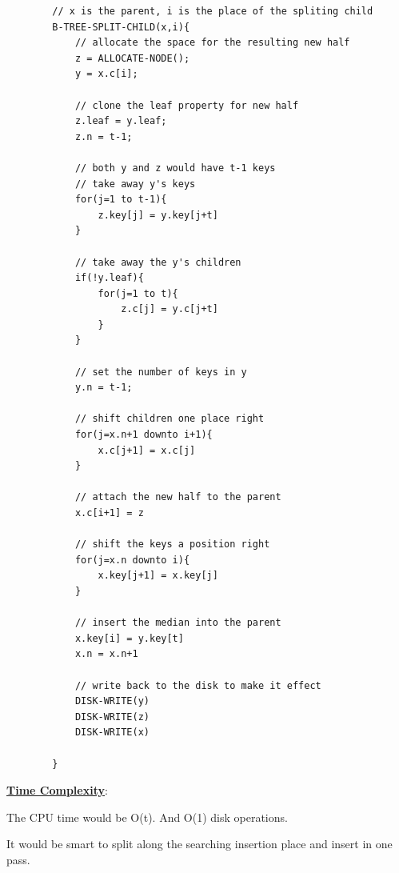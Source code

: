     \begin{lstlisting}
        // x is the parent, i is the place of the spliting child
        B-TREE-SPLIT-CHILD(x,i){
            // allocate the space for the resulting new half
            z = ALLOCATE-NODE();
            y = x.c[i];
            
            // clone the leaf property for new half
            z.leaf = y.leaf;
            z.n = t-1;

            // both y and z would have t-1 keys
            // take away y's keys
            for(j=1 to t-1){
                z.key[j] = y.key[j+t]
            }

            // take away the y's children
            if(!y.leaf){
                for(j=1 to t){
                    z.c[j] = y.c[j+t]
                }
            }

            // set the number of keys in y
            y.n = t-1;

            // shift children one place right
            for(j=x.n+1 downto i+1){
                x.c[j+1] = x.c[j]
            }

            // attach the new half to the parent
            x.c[i+1] = z

            // shift the keys a position right 
            for(j=x.n downto i){
                x.key[j+1] = x.key[j]
            }

            // insert the median into the parent
            x.key[i] = y.key[t]
            x.n = x.n+1

            // write back to the disk to make it effect
            DISK-WRITE(y)
            DISK-WRITE(z)
            DISK-WRITE(x)

        }
    \end{lstlisting}

    \textbf{\underline{Time Complexity}}:

    The CPU time would be O(t). And O(1) disk operations.

    
    It would be smart to split along the searching insertion place 
    and insert in one pass.

